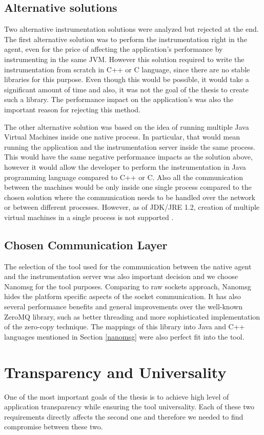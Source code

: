\subsection{Alternative solutions}
Two alternative instrumentation solutions were analyzed but rejected at the end. The first alternative solution was to perform the instrumentation right in the agent, even for the price of affecting the application's performance by instrumenting in the same JVM. However this solution required to write the instrumentation from scratch in C++ or C language, since there are no stable libraries for this purpose. Even though this would be possible, it would take a significant amount of time and also, it was not the goal of the thesis to create such a library. The performance impact on the application's was also the important reason for rejecting this method.

The other alternative solution was based on the idea of running multiple Java Virtual Machines inside one native process. In particular, that would mean running the application and the instrumentation server inside the same process. This would have the same  negative performance impacts as the solution above, however it would allow the developer to perform the instrumentation in Java programming language compared to C++ or C. Also all the communication between the machines would be only inside one single process compared to the chosen solution where the communication needs to be handled over the network or between different processes. However, as of JDK/JRE 1.2, creation of multiple virtual machines in a single process is not supported \cite{MoreJVMOnceProccess}.
							
\subsection{Chosen Communication Layer}
The selection of the tool used for the communication between the native agent and the instrumentation server was also important decision and we choose Nanomsg for the tool purposes. Comparing to raw sockets approach, Nanomsg hides the platform specific aspects of the socket communication. It has also several performance benefits and general improvements over the well-known ZeroMQ library, such as better threading and more sophisticated implementation of the zero-copy technique. The mappings of this library into Java and C++ languages mentioned in Section \ref{nanomsg} were also perfect fit into the tool.
		

\section{Transparency and Universality}
One of the most important goals of the thesis is to achieve high level of application transparency while ensuring the tool universality. Each of these two requirements directly affects the second one and therefore we needed to find compromise between these two.


